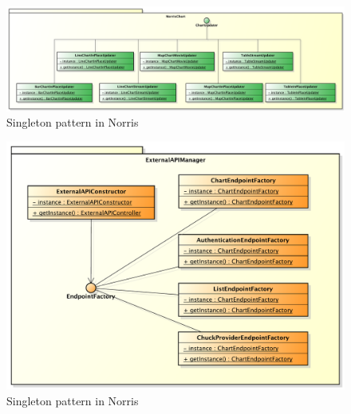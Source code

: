 	    		\begin{figure}[H]\centering
	        		\includegraphics[width=\textwidth]{SpecificaTecnica/Pics/DesignPatternNorris/Singleton1}
	        		\caption{Singleton pattern in Norris}
	    		\end{figure}
	    		\begin{figure}[H]\centering
	        		\includegraphics[width=\textwidth]{SpecificaTecnica/Pics/DesignPatternNorris/Singleton3}
	        		\caption{Singleton pattern in Norris}
	    		\end{figure}
	    		

